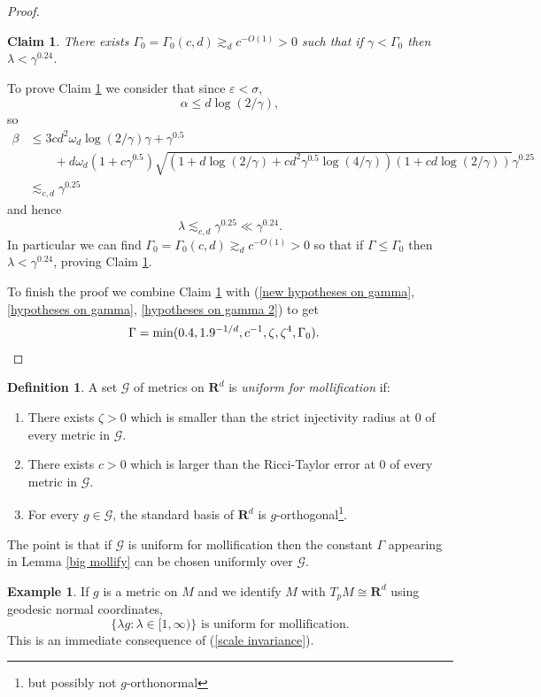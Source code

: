 \documentclass[reqno,12pt,letterpaper]{amsart}
\newcommand{\RR}{\mathbf{R}}
\newcommand{\dfn}[1]{\emph{#1}\index{#1}}
\newtheorem{claim}[theorem]{Claim}
\theoremstyle{definition}
\newtheorem{definition}[theorem]{Definition}
\newtheorem{example}[theorem]{Example}
\numberwithin{equation}{section}
\begin{document}
\begin{proof}
\begin{claim}\label{BMC3}
There exists $\Gamma_0 = \Gamma_0(c, d) \gtrsim_d c^{-O(1)} > 0$ such that if $\gamma < \Gamma_0$ then $\lambda < \gamma^{0.24}$.
\end{claim}

To prove Claim \ref{BMC3} we consider that since $\varepsilon < \sigma$,
$$\alpha \leq d\log(2/\gamma),$$
so
\begin{align*}
\beta &\leq 3cd^2\omega_d\log(2/\gamma)\gamma +  \gamma^{0.5}\\
&\qquad+ d\omega_d(1 + c\gamma^{0.5})\sqrt{(1 + d\log(2/\gamma) + cd^2\gamma^{0.5}\log(4/\gamma))(1 + cd\log(2/\gamma))}\gamma^{0.25}\\
&\lesssim_{c, d} \gamma^{0.25}
\end{align*}
and hence
$$\lambda \lesssim_{c, d} \gamma^{0.25} \ll \gamma^{0.24}.$$
In particular we can find $\Gamma_0 = \Gamma_0(c, d) \gtrsim_d c^{-O(1)} > 0$ so that if $\Gamma \leq \Gamma_0$ then $\lambda < \gamma^{0.24}$, proving Claim \ref{BMC3}.

To finish the proof we combine Claim \ref{BMC3} with (\ref{new hypotheses on gamma}, \ref{hypotheses on gamma}, \ref{hypotheses on gamma 2}) to get
\begin{align*}\Gamma &= \min(0.4, 1.9^{-1/d}, c^{-1}, \zeta, \zeta^4, \Gamma_0). \qedhere
\end{align*}
\end{proof}

\begin{definition}
A set $\mathcal G$ of metrics on $\RR^d$ is \dfn{uniform for mollification} if:
\begin{enumerate}
\item There exists $\zeta > 0$ which is smaller than the strict injectivity radius at $0$ of every metric in $\mathcal G$.
\item There exists $c > 0$ which is larger than the Ricci-Taylor error at $0$ of every metric in $\mathcal G$.
\item For every $g \in \mathcal G$, the standard basis of $\RR^d$ is $g$-orthogonal\footnote{but possibly not $g$-orthonormal}.
\end{enumerate}
\end{definition}

The point is that if $\mathcal G$ is uniform for mollification then the constant $\Gamma$ appearing in Lemma \ref{big mollify} can be chosen uniformly over $\mathcal G$.

\begin{example}
If $g$ is a metric on $M$ and we identify $M$ with $T_pM \cong \RR^d$ using geodesic normal coordinates,
\begin{equation}\label{condition for MDS}
\{\lambda g: \lambda \in [1, \infty)\} \text{ is uniform for mollification.}
\end{equation}
This is an immediate consequence of (\ref{scale invariance}).
\end{example}
\end{document}
